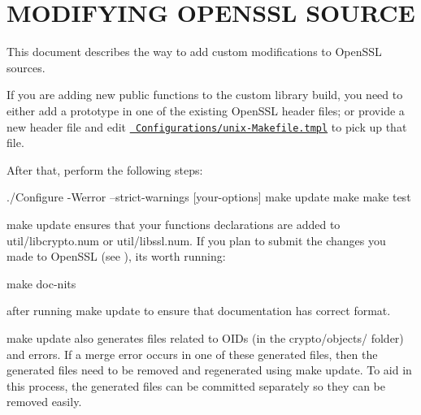 \chapter{MODIFYING OPENSSL SOURCE}
\hypertarget{md__c_1_2_users_2namph_2_downloads_2openssl_2openssl-3_82_81_2_h_a_c_k_i_n_g}{}\label{md__c_1_2_users_2namph_2_downloads_2openssl_2openssl-3_82_81_2_h_a_c_k_i_n_g}
This document describes the way to add custom modifications to Open\+SSL sources.

If you are adding new public functions to the custom library build, you need to either add a prototype in one of the existing Open\+SSL header files; or provide a new header file and edit \href{Configurations/unix-Makefile.tmpl}{\texttt{ Configurations/unix-\/\+Makefile.\+tmpl}} to pick up that file.

After that, perform the following steps\+:

./\+Configure -\/Werror --strict-\/warnings \mbox{[}your-\/options\mbox{]} make update make make test

{\ttfamily make update} ensures that your functions declarations are added to {\ttfamily util/libcrypto.\+num} or {\ttfamily util/libssl.\+num}. If you plan to submit the changes you made to Open\+SSL (see ), it\textquotesingle{}s worth running\+:

make doc-\/nits

after running {\ttfamily make update} to ensure that documentation has correct format.

{\ttfamily make update} also generates files related to OIDs (in the {\ttfamily crypto/objects/} folder) and errors. If a merge error occurs in one of these generated files, then the generated files need to be removed and regenerated using {\ttfamily make update}. To aid in this process, the generated files can be committed separately so they can be removed easily. 